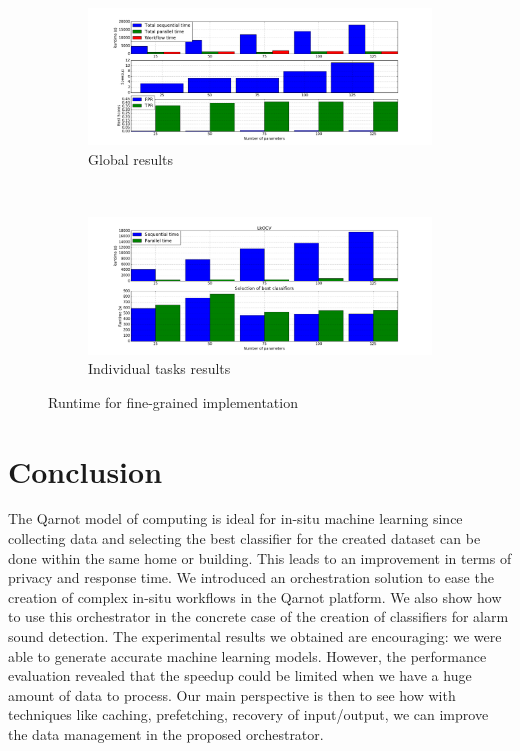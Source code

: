 \documentclass[10pt, conference, compsocconf]{IEEEtran}
\begin{document}
\begin{figure}[h]
  \begin{center}
    \begin{subfigure}{0.5\textwidth}
      \captionsetup{skip=0pt}
      \centering
      \includegraphics[width=\textwidth]{Figures/times_increasparams_global_bars.png}
      \caption{\footnotesize Global results \label{subfig:scalability_glob}}
  \end{subfigure} \\
  \begin{subfigure}{0.5\textwidth}
    \captionsetup{skip=0pt}
    \centering
    \includegraphics[width=\textwidth]{Figures/times_increasparams_individual_bars.png}
    \caption{\footnotesize Individual tasks results \label{subfig:scalability_ind}}
  \end{subfigure}
\end{center}
\caption{Runtime for fine-grained implementation \label{fig:scalability}}
\end{figure}
\section{Conclusion} \label{Conclusion}
The Qarnot model of computing is ideal for in-situ machine learning since collecting data and selecting the best classifier for the created dataset can be done within the same home or building. This leads to an improvement in terms of privacy and response time. We introduced an orchestration solution to ease the creation of complex in-situ workflows in the Qarnot platform. We also show how to use this orchestrator 
in the concrete case of the creation of classifiers for alarm sound detection. The experimental results we obtained are encouraging: 
we were able to generate accurate machine learning models. However, the performance evaluation revealed that the speedup could be limited 
when we have a huge amount of data to process. Our main perspective is then to see how with techniques like caching, prefetching, 
recovery of input/output, we can improve the data management in the proposed orchestrator. 

\def\IEEEbibitemsep{.1pt}






\end{document}
